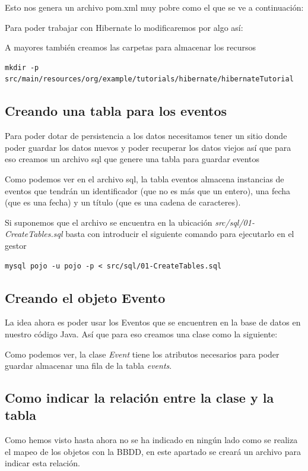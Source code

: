 \documentclass{article}
\begin{document}
Esto nos genera un archivo pom.xml muy pobre como el que se ve a continuación:


Para poder trabajar con Hibernate lo modificaremos por algo así:


A mayores también creamos las carpetas para almacenar los recursos
\begin{lstlisting}[style=bash]
mkdir -p src/main/resources/org/example/tutorials/hibernate/hibernateTutorial
\end{lstlisting}

\subsection{Creando una tabla para los eventos}
	Para poder dotar de persistencia a los datos necesitamos tener un sitio donde poder guardar los datos nuevos y poder recuperar los datos viejos así que para eso creamos un archivo sql que genere una tabla para guardar eventos


	Como podemos ver en el archivo sql, la tabla eventos almacena instancias de eventos que tendrán un identificador (que no es más que un entero), una fecha (que es una fecha) y un título (que es una cadena de caracteres).

	Si suponemos que el archivo se encuentra en la ubicación \emph{src/sql/01-CreateTables.sql} basta con introducir el siguiente comando para ejecutarlo en el gestor
\begin{lstlisting}[style=bash]
 mysql pojo -u pojo -p < src/sql/01-CreateTables.sql
\end{lstlisting}

\subsection{Creando el objeto Evento}
	La idea ahora es poder usar los Eventos que se encuentren en la base de datos en nuestro código Java. Así que para eso creamos una clase como la siguiente:


	Como podemos ver, la clase \emph{Event} tiene los atributos necesarios para poder guardar almacenar una fila de la tabla \emph{events}.

\subsection{Como indicar la relación entre la clase y la tabla}
	Como hemos visto hasta ahora no se ha indicado en ningún lado como se realiza el mapeo de los objetos con la BBDD, en este apartado se creará un archivo para indicar esta relación.
	
\end{document}
